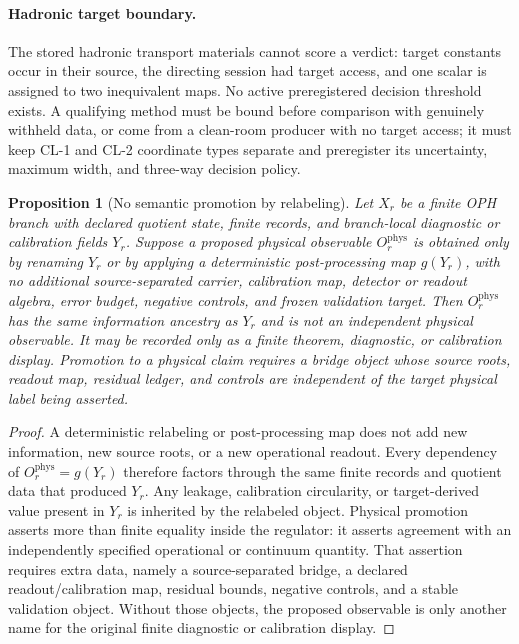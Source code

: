 \documentclass[11pt]{article}
\newtheorem{proposition}[theorem]{Proposition}
\begin{document}
\paragraph{Hadronic target boundary.}
The stored hadronic transport materials cannot score a verdict: target
constants occur in their source, the directing session had target access, and
one scalar is assigned to two inequivalent maps. No active preregistered
decision threshold exists. A qualifying method must be bound before comparison
with genuinely withheld data, or come from a clean-room producer with no target
access; it must keep CL-1 and CL-2 coordinate types separate and preregister its
uncertainty, maximum width, and three-way decision policy.

\begin{proposition}[No semantic promotion by relabeling]\label{prop:no-semantic-promotion}
Let \(X_r\) be a finite OPH branch with declared quotient state, finite records,
and branch-local diagnostic or calibration fields \(Y_r\). Suppose a proposed
physical observable \(O^{\mathrm{phys}}_r\) is obtained only by renaming \(Y_r\)
or by applying a deterministic post-processing map \(g(Y_r)\), with no
additional source-separated carrier, calibration map, detector or readout
algebra, error budget, negative controls, and frozen validation target. Then
\(O^{\mathrm{phys}}_r\) has the same information ancestry as \(Y_r\) and is not
an independent physical observable. It may be recorded only as a finite theorem,
diagnostic, or calibration display. Promotion to a physical claim requires a
bridge object whose source roots, readout map, residual ledger, and controls are
independent of the target physical label being asserted.
\end{proposition}

\begin{proof}
A deterministic relabeling or post-processing map does not add new information,
new source roots, or a new operational readout. Every dependency of
\(O^{\mathrm{phys}}_r=g(Y_r)\) therefore factors through the same finite records
and quotient data that produced \(Y_r\). Any leakage, calibration circularity, or
target-derived value present in \(Y_r\) is inherited by the relabeled object.
Physical promotion asserts more than finite equality inside the regulator: it
asserts agreement with an independently specified operational or continuum
quantity. That assertion requires extra data, namely a source-separated bridge,
a declared readout/calibration map, residual bounds, negative controls, and a
stable validation object. Without those objects, the proposed observable is only another
name for the original finite diagnostic or calibration display.
\end{proof}
\end{document}
